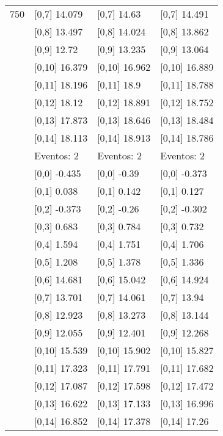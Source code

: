 \begin{table}
\begin{tabular}[t]{llll}
750 & {}[0,7] 14.079 & {}[0,7] 14.63 & {}[0,7] 14.491\\
\addlinespace
 & {}[0,8] 13.497 & {}[0,8] 14.024 & {}[0,8] 13.862\\
 & {}[0,9] 12.72 & {}[0,9] 13.235 & {}[0,9] 13.064\\
 & {}[0,10] 16.379 & {}[0,10] 16.962 & {}[0,10] 16.889\\
 & {}[0,11] 18.196 & {}[0,11] 18.9 & {}[0,11] 18.788\\
 & {}[0,12] 18.12 & {}[0,12] 18.891 & {}[0,12] 18.752\\
\addlinespace
 & {}[0,13] 17.873 & {}[0,13] 18.646 & {}[0,13] 18.484\\
 & {}[0,14] 18.113 & {}[0,14] 18.913 & {}[0,14] 18.786\\
 & Eventos:  2 & Eventos:  2 & Eventos:  2\\
 & {}[0,0] -0.435 & {}[0,0] -0.39 & {}[0,0] -0.373\\
 & {}[0,1] 0.038 & {}[0,1] 0.142 & {}[0,1] 0.127\\
\addlinespace
 & {}[0,2] -0.373 & {}[0,2] -0.26 & {}[0,2] -0.302\\
 & {}[0,3] 0.683 & {}[0,3] 0.784 & {}[0,3] 0.732\\
 & {}[0,4] 1.594 & {}[0,4] 1.751 & {}[0,4] 1.706\\
 & {}[0,5] 1.208 & {}[0,5] 1.378 & {}[0,5] 1.336\\
 & {}[0,6] 14.681 & {}[0,6] 15.042 & {}[0,6] 14.924\\
\addlinespace
1000 & {}[0,7] 13.701 & {}[0,7] 14.061 & {}[0,7] 13.94\\
 & {}[0,8] 12.923 & {}[0,8] 13.273 & {}[0,8] 13.144\\
 & {}[0,9] 12.055 & {}[0,9] 12.401 & {}[0,9] 12.268\\
 & {}[0,10] 15.539 & {}[0,10] 15.902 & {}[0,10] 15.827\\
 & {}[0,11] 17.323 & {}[0,11] 17.791 & {}[0,11] 17.682\\
\addlinespace
 & {}[0,12] 17.087 & {}[0,12] 17.598 & {}[0,12] 17.472\\
 & {}[0,13] 16.622 & {}[0,13] 17.133 & {}[0,13] 16.996\\
 & {}[0,14] 16.852 & {}[0,14] 17.378 & {}[0,14] 17.26\\
\bottomrule
\end{tabular}
\end{table}
